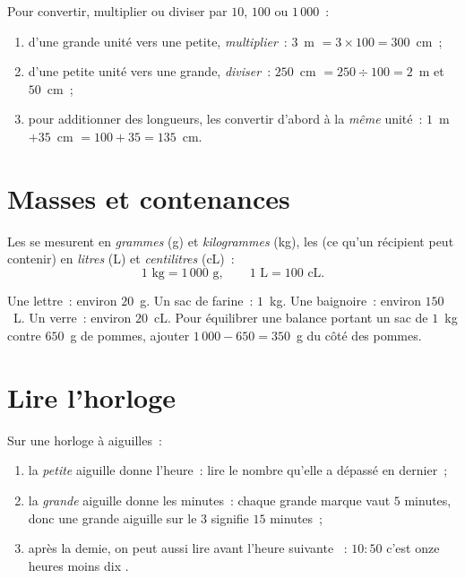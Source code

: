 \begin{method}\label{met:g3:measure:convert}
Pour convertir, multiplier ou diviser par $10$, $100$ ou $1\,000$~:
\begin{enumerate}
  \item d'une grande unité vers une petite, \emph{multiplier}~:
        $3$~m $= 3 \times 100 = 300$~cm~;
  \item d'une petite unité vers une grande, \emph{diviser}~:
        $250$~cm $= 250 \div 100 = 2$~m et $50$~cm~;
  \item pour additionner des longueurs, les convertir d'abord à la
        \emph{même} unité~: $1$~m $+ 35$~cm $= 100 + 35 =
        135$~cm.
\end{enumerate}
\end{method}

\section{Masses et contenances}

\begin{definition}\label{def:g3:measure:mass}
Les  se mesurent en \emph{grammes} (g) et \emph{kilogrammes}
(kg), les  (ce qu'un récipient peut contenir) en
\emph{litres} (L) et \emph{centilitres} (cL)~:
\[
1 \text{ kg} = 1\,000 \text{ g},
\qquad
1 \text{ L} = 100 \text{ cL}.
\]
\end{definition}

\begin{example}\label{ex:g3:measure:mass}
Une lettre~: environ $20$~g. Un sac de farine~: $1$~kg. Une baignoire~:
environ $150$~L. Un verre~: environ $20$~cL. Pour équilibrer une
balance portant un sac de $1$~kg contre $650$~g de pommes, ajouter
$1\,000 - 650 = 350$~g du côté des pommes.
\end{example}

\section{Lire l'horloge}

\begin{method}\label{met:g3:measure:clock}
Sur une horloge à aiguilles~:
\begin{enumerate}
  \item la \emph{petite} aiguille donne l'heure~: lire le nombre
        qu'elle a dépassé en dernier~;
  \item la \emph{grande} aiguille donne les minutes~: chaque grande
        marque vaut $5$ minutes, donc une grande aiguille sur le $3$
        signifie $15$ minutes~;
  \item après la demie, on peut aussi lire \guillemotleft{} avant
        l'heure suivante \guillemotright{}~: $10{:}50$ c'est
        \guillemotleft{} onze heures moins dix \guillemotright{}.
\end{enumerate}
\end{method}

